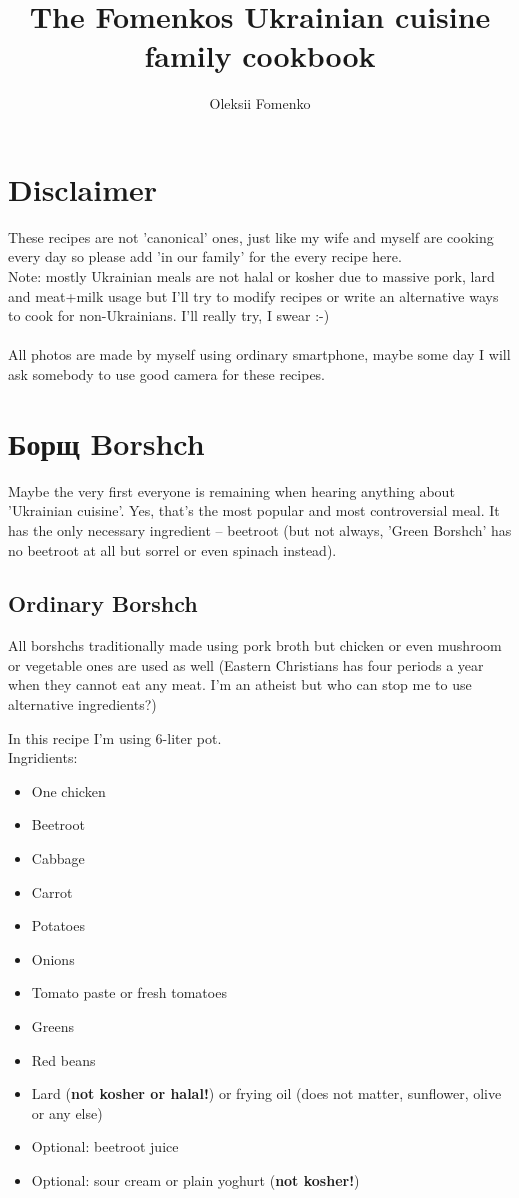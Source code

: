 \documentclass[11pt,a4paper]{article}
\title{\textbf{The Fomenkos Ukrainian cuisine family cookbook}}
\author{Oleksii Fomenko}
\date{}
\begin{document}
\section*{Disclaimer}
These recipes are not 'canonical' ones, just like my wife and myself are cooking every day so please add 'in our family' for the every recipe here.
\\

Note: mostly Ukrainian meals are not halal or kosher due to massive pork, lard and meat+milk usage but I'll try to modify recipes or write an alternative ways to cook for non-Ukrainians. I'll really try, I swear :-)
\\
\\
All photos are made by myself using ordinary smartphone, maybe some day I will ask somebody to use good camera for these recipes.
\\

\section*{Борщ Borshch \textipa{['bO:rS]}}
Maybe the very first everyone is remaining when hearing anything about 'Ukrainian cuisine'.
Yes, that's the most popular and most controversial meal. It has the only necessary ingredient -- beetroot (but not always, 'Green Borshch' has no beetroot at all but sorrel or even spinach instead).

\subsection*{Ordinary Borshch}
All borshchs traditionally made using pork broth but chicken or even mushroom or vegetable ones are used as well (Eastern Christians has four periods a year when they cannot eat any meat. I'm an atheist but who can stop me to use alternative ingredients?)

In this recipe I'm using 6-liter pot. \\

Ingridients:
\begin{itemize}
\item One chicken
\item Beetroot
\item Cabbage
\item Carrot
\item Potatoes
\item Onions
\item Tomato paste or fresh tomatoes
\item Greens
\item Red beans
\item Lard (\textbf{not kosher or halal!}) or frying oil (does not matter, sunflower, olive or any else)
\item Optional: beetroot juice
\item Optional: sour cream or plain yoghurt (\textbf{not kosher!})
\end{itemize}
\end{document}
